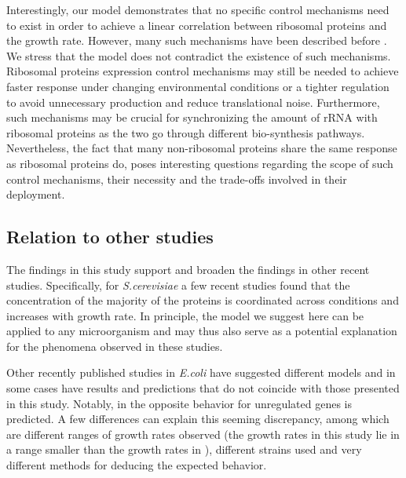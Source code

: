 \documentclass[notitlepage]{article}
\begin{document}
Interestingly, our model demonstrates that no specific control mechanisms need to exist in order to achieve a linear correlation between ribosomal proteins and the growth rate.
However, many such mechanisms have been described before \cite{Nomura1984}.
We stress that the model does not contradict the existence of such mechanisms.
Ribosomal proteins expression control mechanisms may still be needed to achieve faster response under changing environmental conditions or a tighter regulation to avoid unnecessary production and reduce translational noise.
Furthermore, such mechanisms may be crucial for synchronizing the amount of rRNA with ribosomal proteins as the two go through different bio-synthesis pathways.
Nevertheless, the fact that many non-ribosomal proteins share the same response as ribosomal proteins do, poses interesting questions regarding the scope of such control mechanisms, their necessity and the trade-offs involved in their deployment.

\subsection{Relation to other studies}
The findings in this study support and broaden the findings in other recent studies.
Specifically, for \emph{S.cerevisiae} a few recent studies found that the concentration of the majority of the proteins is coordinated across conditions \cite{Keren2013a, Gasch2000, Brauer2008a} and increases with growth rate. %
In principle, the model we suggest here can be applied to any microorganism and may thus also serve as a potential explanation for the phenomena observed in these studies.

Other recently published studies in \emph{E.coli} have suggested different models and in some cases have results  and predictions that do not coincide with those presented in this study.
Notably, in \cite{Klumpp2009a} the opposite behavior for unregulated genes is predicted.
A few differences can explain this seeming discrepancy, among which are different ranges of growth rates observed (the growth rates in this study lie in a range smaller than the growth rates in \cite{Klumpp2009a}), different strains used and very different methods for deducing the expected behavior. %
\end{document}

